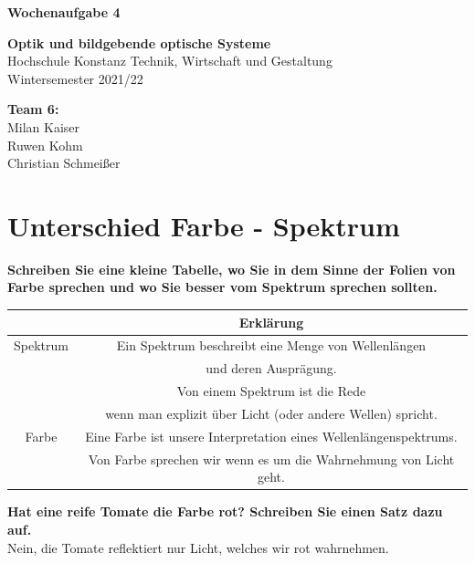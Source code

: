 \documentclass[a4paper]{article}
\begin{document}
	\thispagestyle{empty}
	
	\begin{center}\strut
		\bfseries\Huge
		Wochenaufgabe 4
	\end{center}
	\vfill
	
	\begin{center}\strut
		\textbf{Optik und bildgebende optische Systeme}\\
		Hochschule Konstanz Technik, Wirtschaft und Gestaltung\\
		Wintersemester 2021/22
	\end{center}
	
	\begin{center}\strut
		\textbf{Team 6:}\\
		Milan Kaiser\\
		Ruwen Kohm\\
		Christian Schmeißer\\
	\end{center}
	\vfill
	\vfill

	\clearpage
	
	\section{Unterschied Farbe - Spektrum}
	\textbf{Schreiben Sie eine kleine Tabelle, wo Sie in dem Sinne der Folien von Farbe sprechen und wo Sie besser vom Spektrum sprechen sollten.}\\
	\begin{center}
	\begin{tabular}{ c|c }
		 & Erklärung \\ 
		\hline
		Spektrum & Ein Spektrum beschreibt eine Menge von Wellenlängen\\
		& und deren Ausprägung.\\
		& Von einem Spektrum ist die Rede \\ 
		& wenn man explizit über Licht (oder andere Wellen) spricht.\\
		\hline
		Farbe & Eine Farbe ist unsere Interpretation eines Wellenlängenspektrums.\\
		& Von Farbe sprechen wir wenn es um die Wahrnehmung von Licht geht.\\
	\end{tabular}
	\end{center}
	\vspace{10pt}
	
	\textbf{Hat eine reife Tomate die Farbe rot? Schreiben Sie einen Satz dazu auf.}\\
	Nein, die Tomate reflektiert nur Licht, welches wir rot wahrnehmen.\\
	
\end{document}
